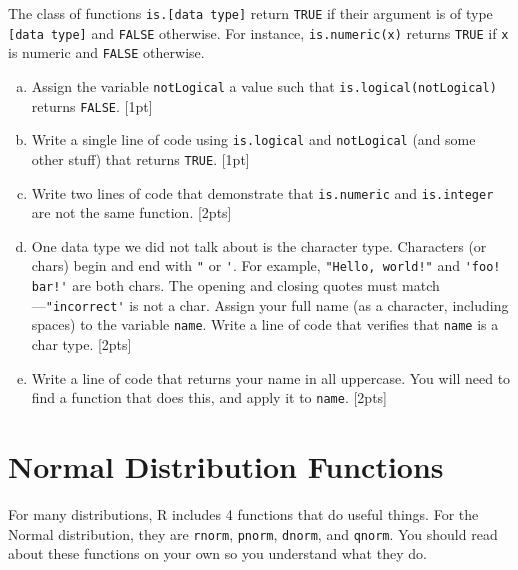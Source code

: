\documentclass[12pt]{article}
\begin{document}
The class of functions \verb|is.[data type]| return \verb|TRUE| if their argument is of type \verb|[data type]| and \verb|FALSE| otherwise. For instance, \verb|is.numeric(x)| returns \verb|TRUE| if \verb|x| is numeric and \verb|FALSE| otherwise.

\begin{enumerate}[(a)]
\item Assign the variable \verb|notLogical| a value such that \verb|is.logical(notLogical)| returns \verb|FALSE|. [1pt]
\item Write a single line of code using \verb|is.logical| and \verb|notLogical| (and some other stuff) that returns \verb|TRUE|. [1pt]
\item Write two lines of code that demonstrate that \verb|is.numeric| and \verb|is.integer| are not the same function. [2pts]
\item One data type we did not talk about is the character type. Characters (or chars) begin and end with \verb|"| or \verb|'|. For example, \verb|"Hello, world!"| and \verb|'foo! bar!'| are both chars. The opening and closing quotes must match---\verb|"incorrect'| is not a char. Assign your full name (as a character, including spaces) to the variable \verb|name|. Write a line of code that verifies that \verb|name| is a char type. [2pts]
\item Write a line of code that returns your name in all uppercase. You will need to find a function that does this, and apply it to \verb|name|. [2pts]
\end{enumerate}

\section{Normal Distribution Functions}

For many distributions, R includes 4 functions that do useful things. For the Normal distribution, they are \verb|rnorm|, \verb|pnorm|, \verb|dnorm|, and \verb|qnorm|. You should read about these functions on your own so you understand what they do.
\end{document}
